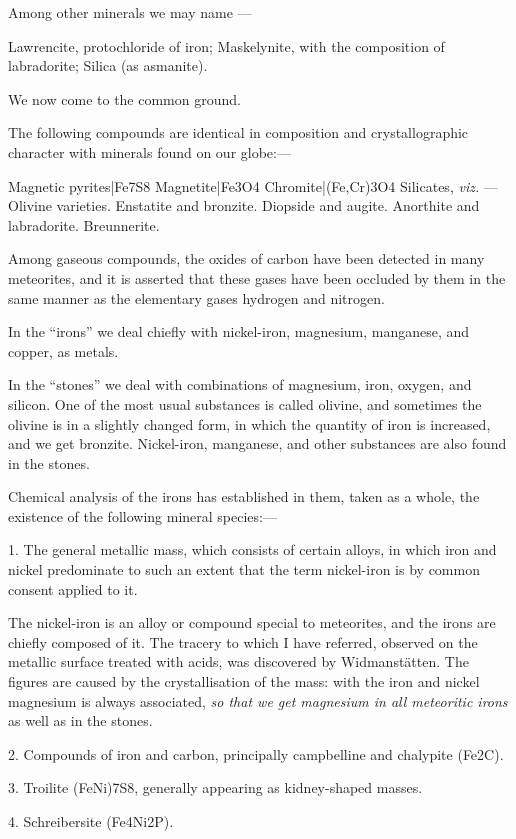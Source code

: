 \documentclass[a4paper, 12pt, oneside, polutonikogreek, english]{article}
\begin{document}
Among other minerals we may name ---

Lawrencite, protochloride of iron; 
Maskelynite, with the composition of labradorite; 
Silica (as asmanite).

We now come to the common ground.

The following compounds are identical in composition and crystallographic character with minerals found on our globe:---

Magnetic pyrites|Fe7S8 
Magnetite|Fe3O4 
Chromite|(Fe,Cr)3O4 
Silicates, \emph{viz.} --- 
Olivine varieties. 
Enstatite and bronzite. 
Diopside and augite. 
Anorthite and labradorite. 
Breunnerite.

Among gaseous compounds, the oxides of carbon have been detected in many meteorites, and it is asserted that these gases have been occluded by them in the same manner as the elementary gases hydrogen and nitrogen.

In the ``irons'' we deal chiefly with nickel-iron, magnesium, manganese, and copper, as metals.

In the ``stones'' we deal with combinations of magnesium, iron, oxygen, and silicon. One of the most usual substances is called olivine, and sometimes the olivine is in a slightly changed form, in which the quantity of iron is increased, and we get bronzite. Nickel-iron, manganese, and other substances are also found in the stones.

Chemical analysis of the irons has established in them, taken as a whole, the existence of the following mineral species:---

1. The general metallic mass, which consists of certain alloys, in which iron and nickel predominate to such an extent that the term nickel-iron is by common consent applied to it.

The nickel-iron is an alloy or compound special to meteorites, and the irons are chiefly composed of it. The tracery to which I have referred, observed on the metallic surface treated with acids, was discovered by Widmanstätten. The figures are caused by the crystallisation of the mass: with the iron and nickel magnesium is always associated, \emph{so that we get magnesium in all meteoritic irons} as well as in the stones.

2. Compounds of iron and carbon, principally campbelline and chalypite (Fe2C).

3. Troilite (FeNi)7S8, generally appearing as kidney-shaped masses.

4. Schreibersite (Fe4Ni2P).
\end{document}
